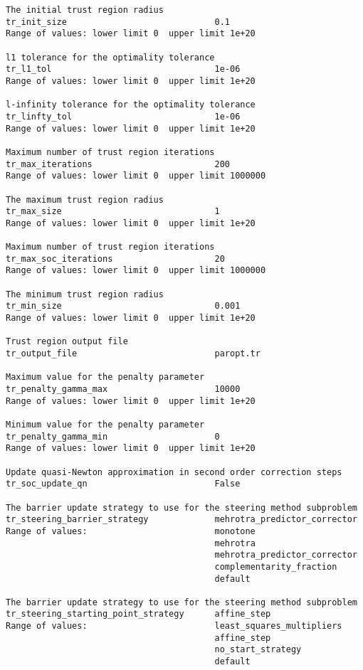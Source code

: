 \documentclass[12pt]{article}
\begin{document}
{\begin{verbatim}
The initial trust region radius
tr_init_size                             0.1
Range of values: lower limit 0  upper limit 1e+20

l1 tolerance for the optimality tolerance
tr_l1_tol                                1e-06
Range of values: lower limit 0  upper limit 1e+20

l-infinity tolerance for the optimality tolerance
tr_linfty_tol                            1e-06
Range of values: lower limit 0  upper limit 1e+20

Maximum number of trust region iterations
tr_max_iterations                        200
Range of values: lower limit 0  upper limit 1000000

The maximum trust region radius
tr_max_size                              1
Range of values: lower limit 0  upper limit 1e+20

Maximum number of trust region iterations
tr_max_soc_iterations                    20
Range of values: lower limit 0  upper limit 1000000

The minimum trust region radius
tr_min_size                              0.001
Range of values: lower limit 0  upper limit 1e+20

Trust region output file
tr_output_file                           paropt.tr

Maximum value for the penalty parameter
tr_penalty_gamma_max                     10000
Range of values: lower limit 0  upper limit 1e+20

Minimum value for the penalty parameter
tr_penalty_gamma_min                     0
Range of values: lower limit 0  upper limit 1e+20

Update quasi-Newton approximation in second order correction steps
tr_soc_update_qn                         False

The barrier update strategy to use for the steering method subproblem
tr_steering_barrier_strategy             mehrotra_predictor_corrector
Range of values:                         monotone
                                         mehrotra
                                         mehrotra_predictor_corrector
                                         complementarity_fraction
                                         default

The barrier update strategy to use for the steering method subproblem
tr_steering_starting_point_strategy      affine_step
Range of values:                         least_squares_multipliers
                                         affine_step
                                         no_start_strategy
                                         default


\end{verbatim}}
\end{document}

